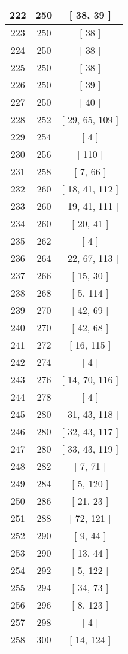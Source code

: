 \begin{center}
\begin{longtable}[H]{|| c c c ||}
222 & 250 & [ 38, 39 ]
\\\hline
223 & 250 & [ 38 ]
\\\hline
224 & 250 & [ 38 ]
\\\hline
225 & 250 & [ 38 ]
\\\hline
226 & 250 & [ 39 ]
\\\hline
227 & 250 & [ 40 ]
\\\hline
228 & 252 & [ 29, 65, 109 ]
\\\hline
229 & 254 & [ 4 ]
\\\hline
230 & 256 & [ 110 ]
\\\hline
231 & 258 & [ 7, 66 ]
\\\hline
232 & 260 & [ 18, 41, 112 ]
\\\hline
233 & 260 & [ 19, 41, 111 ]
\\\hline
234 & 260 & [ 20, 41 ]
\\\hline
235 & 262 & [ 4 ]
\\\hline
236 & 264 & [ 22, 67, 113 ]
\\\hline
237 & 266 & [ 15, 30 ]
\\\hline
238 & 268 & [ 5, 114 ]
\\\hline
239 & 270 & [ 42, 69 ]
\\\hline
240 & 270 & [ 42, 68 ]
\\\hline
241 & 272 & [ 16, 115 ]
\\\hline
242 & 274 & [ 4 ]
\\\hline
243 & 276 & [ 14, 70, 116 ]
\\\hline
244 & 278 & [ 4 ]
\\\hline
245 & 280 & [ 31, 43, 118 ]
\\\hline
246 & 280 & [ 32, 43, 117 ]
\\\hline
247 & 280 & [ 33, 43, 119 ]
\\\hline
248 & 282 & [ 7, 71 ]
\\\hline
249 & 284 & [ 5, 120 ]
\\\hline
250 & 286 & [ 21, 23 ]
\\\hline
251 & 288 & [ 72, 121 ]
\\\hline
252 & 290 & [ 9, 44 ]
\\\hline
253 & 290 & [ 13, 44 ]
\\\hline
254 & 292 & [ 5, 122 ]
\\\hline
255 & 294 & [ 34, 73 ]
\\\hline
256 & 296 & [ 8, 123 ]
\\\hline
257 & 298 & [ 4 ]
\\\hline
258 & 300 & [ 14, 124 ]

\end{longtable}
\end{center}
